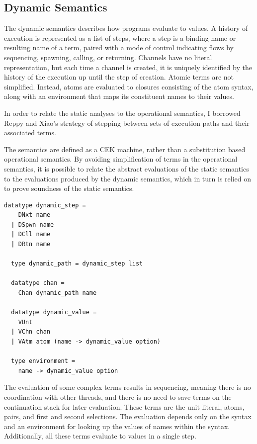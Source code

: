 \documentclass[letterpaper, 11pt]{extarticle}
\begin{document}
\subsection{Dynamic Semantics}
The dynamic semantics describes how programs evaluate to values.
A history of execution is represented as a list of steps, where a step is a
binding name or resulting name of a term, paired with a mode of control indicating
flows by sequencing, spawning, calling, or returning.
Channels have no literal representation, but each
time a channel is created, it is uniquely identified by the history of the execution up until
the step of creation. Atomic terms are not simplified. Instead, atoms are evaluated to
closures consisting of the atom syntax, along with an environment that maps its
constituent names to their values.

In order to relate the static analyses to the operational semantics, I
borrowed Reppy and Xiao's strategy of stepping between sets of execution paths and
their associated terms.

The semantics are defined as a CEK machine, rather than a
substitution based operational semantics. By avoiding simplification of terms in the
operational semantics, it is possible to relate
the abstract evaluations of the static semantics to the
evaluations produced by the dynamic semantics,
which in turn is relied on to prove soundness of the static semantics.


\begin{lstlisting}[language=logic]
  datatype dynamic_step =
    DNxt name
  | DSpwn name
  | DCll name
  | DRtn name 

  type dynamic_path = dynamic_step list

  datatype chan =
    Chan dynamic_path name 

  datatype dynamic_value = 
    VUnt
  | VChn chan
  | VAtm atom (name -> dynamic_value option)

  type environment =
    name -> dynamic_value option
\end{lstlisting}

The evaluation of some complex terms results in sequencing, meaning there is no coordination
with other threads, and there is no need to save terms on
the continuation stack for later evaluation. These terms are the
unit literal, atoms, pairs, and first and second selections. The evaluation depends only
on the syntax and an environment for looking up the values of names within the syntax.
Additionally, all these terms evaluate to values in a single step.
\end{document}
